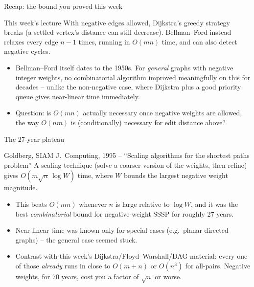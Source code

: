 \documentclass[11pt,aspectratio=169]{beamer}
\begin{document}
\begin{frame}{Recap: the bound you proved this week}
  \begin{block}{This week's lecture}
    With negative edges allowed, Dijkstra's greedy strategy breaks (a settled vertex's
    distance can still decrease). Bellman--Ford instead relaxes every edge $n-1$ times,
    running in $O(mn)$ time, and can also detect negative cycles.
  \end{block}
  \begin{itemize}
    \item Bellman--Ford itself dates to the 1950s. For \emph{general} graphs with
    negative integer weights, no combinatorial algorithm improved meaningfully on this
    for decades -- unlike the non-negative case, where Dijkstra plus a good priority
    queue gives near-linear time immediately.
    \item Question: is $O(mn)$ actually necessary once negative weights are allowed, the
    way $O(nm)$ is (conditionally) necessary for edit distance above?
  \end{itemize}
\end{frame}

\begin{frame}{The 27-year plateau}
  \begin{block}{Goldberg, SIAM J.\ Computing, 1995 -- ``Scaling algorithms for the
  shortest paths problem''}
    A scaling technique (solve a coarser version of the weights, then refine) gives
    $O(m\sqrt{n}\,\log W)$ time, where $W$ bounds the largest negative weight magnitude.
  \end{block}
  \begin{itemize}
    \item This beats $O(mn)$ whenever $n$ is large relative to $\log W$, and it was the
    best \emph{combinatorial} bound for negative-weight SSSP for roughly 27 years.
    \item Near-linear time was known only for special cases (e.g.\ planar directed
    graphs) -- the general case seemed stuck.
    \item Contrast with this week's Dijkstra/Floyd--Warshall/DAG material: every one of
    those \emph{already} runs in close to $O(m+n)$ or $O(n^3)$ for all-pairs. Negative
    weights, for 70 years, cost you a factor of $\sqrt{n}$ or worse.
  \end{itemize}
\end{frame}
\end{document}
